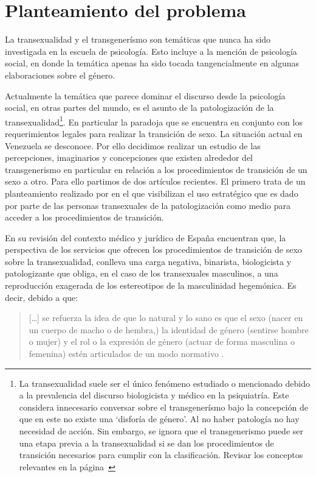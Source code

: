 \section{Planteamiento del problema}

La transexualidad y el transgenerísmo son temáticas que nunca ha sido
investigada en la escuela de psicología. Esto incluye a la mención de psicología
social, en donde la temática apenas ha sido tocada tangencialmente en algunas
elaboraciones sobre el género.

Actualmente la temática que parece dominar el discurso desde la psicología
social, en otras partes del mundo, es el asunto de la patologización de la
transexualidad\footnote{La transexualidad suele ser el único fenómeno estudiado
o mencionado debido a la prevalencia del discurso biologicista y médico en la
psiquiatría. Este considera innecesario conversar sobre el transgenerísmo bajo
la concepción de que en este no existe una ‘disforía de género’. Al no haber
patología no hay necesidad de acción. Sin embargo, se ignora que el
transgenerismo puede ser una etapa previa a la transexualidad si se dan los
procedimientos de transición necesarios para cumplir con la clasificación.
Revisar los conceptos relevantes en la página~\pageref{diferencia}}. En
particular la paradoja que se encuentra en conjunto con los requerimientos
legales para realizar la transición de sexo. La situación actual en Venezuela se
desconoce. Por ello decidimos realizar un estudio de las percepciones,
imaginarios y concepciones que existen alrededor del transgenerismo en
particular en relación a los procedimientos de transición de un sexo a otro.
Para ello partimos de dos artículos recientes. El primero trata de un
planteamiento realizado por \textcite{Coll-Planas2015} en el que visibilizan el
uso estratégico que es dado por parte de las personas transexuales de la
patologización como medio para acceder a los procedimientos de transición.

En su revisión del contexto médico y jurídico de España encuentran que, la
perspectiva de los servicios que ofrecen los procedimientos de transición de
sexo sobre la transexualidad, conlleva una carga negativa, binarista,
biologicista y patologizante que obliga, en el caso de los transexuales
masculinos, a una reproducción exagerada de los estereotipos de la masculinidad
hegemónica. Es decir, debido a que:

\begin{quote}
[…] se refuerza la idea de que lo natural y lo sano es que el sexo (nacer en un
cuerpo de macho o de hembra,) la identidad de género (sentirse hombre o
mujer) y el rol o la expresión de género (actuar de forma masculina o
femenina) estén articulados de un modo normativo \parencite[][p.
426]{Coll-Planas2015}.
\end{quote}

